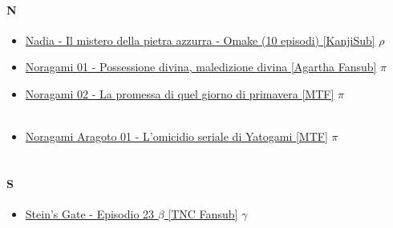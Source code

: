 		\paragraph{N} \hypertarget{ON}{}
			\begin{itemize}
				\item \href{https://mega.nz/#F!Ud5j3DzQ!XKzDr-7KIwzsX7rlYHFCsg} {Nadia - Il mistero della pietra azzurra - Omake (10 episodi) [KanjiSub]} $\rho$ \\ 
				\item \href{https://mega.nz/#!QUYF1KrT!EnFg17gso1z6wThJxdPDstBJgB6TeBco_RuyA94BPIg} {Noragami 01 - Possessione divina, maledizione divina [Agartha Fansub]} $\pi$ \\  
				\item \href{https://mega.nz/#!FJBSyQ7Q!lpvcsG_jLycTKekBXYcYVY53vjoZ4kl_UE0oLp2QENs} {Noragami 02 - La promessa di quel giorno di primavera [MTF]} $\pi$ \\ \\  
				\item \href{https://mega.nz/#!9QAXFZhB!KNMj1Jwm4jTWbbhkqdVEjVGMzZHnqDoFweHHm0qeA8o} {Noragami Aragoto 01 - L'omicidio seriale di Yatogami [MTF]} $\pi$ \\ \\  
			
			\end{itemize}
			
		\paragraph{S} \hypertarget{OS}{}
			\begin{itemize}
				\item \href{https://mega.nz/#!Q1JiUSTa!gvcba3yl3TQXsZlx38SfqO_SHYqWDcRCpjoOsoTfknw} {Stein's Gate - Episodio 23 $\beta$ [TNC Fansub]} $\gamma$  \\  
				
			\end{itemize}	